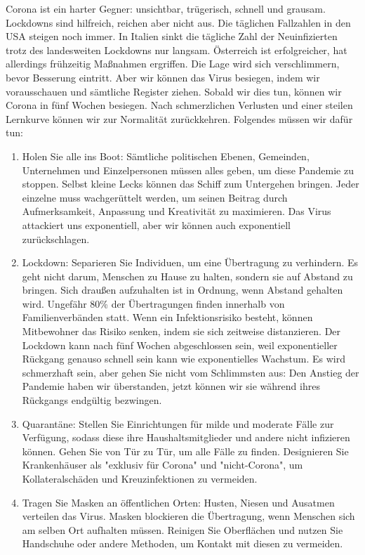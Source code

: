 \documentclass[onecolumn,journal]{IEEEtran}
\begin{document}
\begin{multicols}{2}
Corona ist ein harter Gegner: unsichtbar, trügerisch, schnell und grausam. Lockdowns sind hilfreich, reichen aber nicht aus. Die täglichen Fallzahlen in den USA steigen noch immer. In Italien sinkt die tägliche Zahl der Neuinfizierten trotz des landesweiten Lockdowns nur langsam. Österreich ist erfolgreicher, hat allerdings frühzeitig Maßnahmen ergriffen. Die Lage wird sich verschlimmern, bevor Besserung eintritt. Aber wir können das Virus besiegen, indem wir vorausschauen und sämtliche Register ziehen. Sobald wir dies tun, können wir Corona in fünf Wochen besiegen. Nach schmerzlichen Verlusten und einer steilen Lernkurve können wir zur Normalität zurückkehren. Folgendes müssen wir dafür tun:

\begin{enumerate}
\item Holen Sie alle ins Boot: Sämtliche politischen Ebenen, Gemeinden, Unternehmen und Einzelpersonen müssen alles geben, um diese Pandemie zu stoppen. Selbst kleine Lecks können das Schiff zum Untergehen bringen. Jeder einzelne muss wachgerüttelt werden, um seinen Beitrag durch Aufmerksamkeit, Anpassung und Kreativität zu maximieren. Das Virus attackiert uns exponentiell, aber wir können auch exponentiell zurückschlagen.
\item Lockdown: Separieren Sie Individuen, um eine Übertragung zu verhindern. Es geht nicht darum, Menschen zu Hause zu halten, sondern sie auf Abstand zu bringen. Sich draußen aufzuhalten ist in Ordnung, wenn Abstand gehalten wird. Ungefähr 80\% der Übertragungen finden innerhalb von Familienverbänden statt. Wenn ein Infektionsrisiko besteht, können Mitbewohner das Risiko senken, indem sie sich zeitweise distanzieren. Der Lockdown kann nach fünf Wochen abgeschlossen sein, weil exponentieller Rückgang genauso schnell sein kann wie exponentielles Wachstum. Es wird schmerzhaft sein, aber gehen Sie nicht vom Schlimmsten aus: Den Anstieg der Pandemie haben wir überstanden, jetzt können wir sie während ihres Rückgangs endgültig bezwingen.
\item Quarantäne: Stellen Sie Einrichtungen für milde und moderate Fälle zur Verfügung, sodass diese ihre Haushaltsmitglieder und andere nicht infizieren können. Gehen Sie von Tür zu Tür, um alle Fälle zu finden. Designieren Sie Krankenhäuser als "exklusiv für Corona" und "nicht-Corona", um Kollateralschäden und Kreuzinfektionen zu vermeiden.
\item Tragen Sie Masken an öffentlichen Orten: Husten, Niesen und Ausatmen verteilen das Virus. Masken blockieren die Übertragung, wenn Menschen sich am selben Ort aufhalten müssen. Reinigen Sie Oberflächen und nutzen Sie Handschuhe oder andere Methoden, um Kontakt mit diesen zu vermeiden.

\end{enumerate}
\end{multicols}
\end{document}
